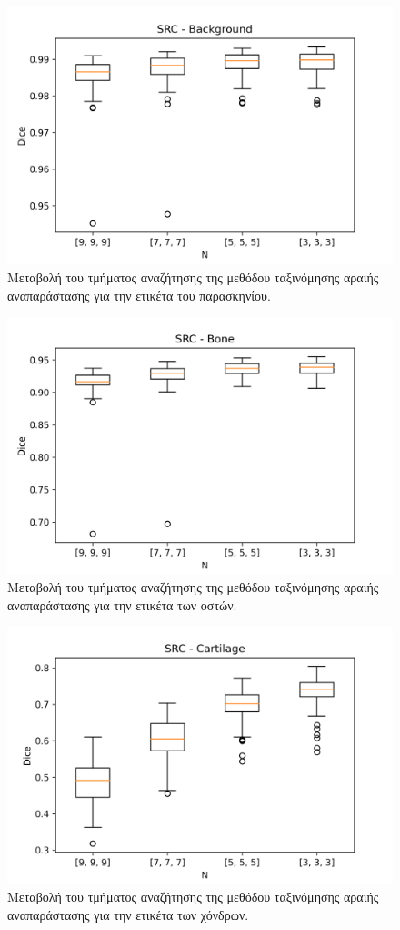 \documentclass[a4paper,12pt]{article}
\begin{document}
\begin{figure}[H]
    \centering
    \includegraphics[width=0.85\linewidth]{SRC_N_Background_plot.png}
    \caption{Μεταβολή του τμήματος αναζήτησης της μεθόδου ταξινόμησης αραιής
             αναπαράστασης για την ετικέτα του παρασκηνίου.}
    \label{fig:SRC:N:1}
\end{figure}

\begin{figure}[H]
    \centering
    \includegraphics[width=0.85\linewidth]{SRC_N_Bone_plot.png}
    \caption{Μεταβολή του τμήματος αναζήτησης της μεθόδου ταξινόμησης αραιής
             αναπαράστασης για την ετικέτα των οστών.}
    \label{fig:SRC:N:2}
\end{figure}

\begin{figure}[H]
    \centering
    \includegraphics[width=0.85\linewidth]{SRC_N_Cartilage_plot.png}
    \caption{Μεταβολή του τμήματος αναζήτησης της μεθόδου ταξινόμησης αραιής
             αναπαράστασης για την ετικέτα των χόνδρων.}
    \label{fig:SRC:N:3}
\end{figure}
\end{document}
